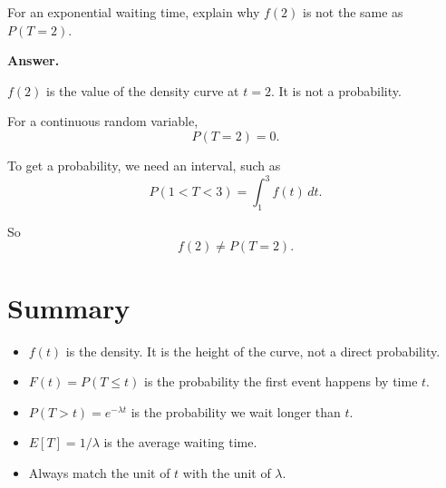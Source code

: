 \documentclass[12pt]{article}
\begin{document}
For an exponential waiting time, explain why \(f(2)\) is not the same as \(P(T=2)\).

\textbf{Answer.}

\(f(2)\) is the value of the density curve at \(t=2\). It is not a probability.

For a continuous random variable,
\[
P(T=2)=0.
\]

To get a probability, we need an interval, such as
\[
P(1<T<3)=\int_1^3 f(t)\,dt.
\]

So
\[
\boxed{f(2)\neq P(T=2).}
\]

\section{Summary}

\begin{itemize}
    \item \(f(t)\) is the density. It is the height of the curve, not a direct probability.
    \item \(F(t)=P(T\leq t)\) is the probability the first event happens by time \(t\).
    \item \(P(T>t)=e^{-\lambda t}\) is the probability we wait longer than \(t\).
    \item \(E[T]=1/\lambda\) is the average waiting time.
    \item Always match the unit of \(t\) with the unit of \(\lambda\).
\end{itemize}
\end{document}
